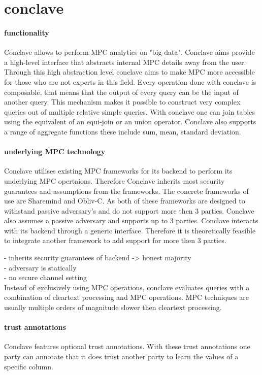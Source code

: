 \section{conclave}


\paragraph {functionality}
Conclave allows to perform MPC analytics on "big data". Conclave aims provide a high-level interface that abstracts internal MPC details away from the user. Through this high abstraction level conclave aims to make MPC more accessible for those who are not experts in this field.  Every operation done with conclave is composable, that means that the output of every query can be the input of another query. This mechanism makes it possible to construct very complex queries out of multiple relative simple queries.  With conclave one can join tables using the equivalent of an equi-join or an union operator. Conclave also supports a range of aggregate functions these include sum, mean, standard deviation. 

\paragraph{underlying MPC technology}
Conclave utilises existing MPC frameworks for its backend to perform its underlying MPC opertaions. Therefore Conclave inherits most security guarantees and assumptions from the frameworks. The concrete frameworks of use are Sharemind and Obliv-C. As both of these frameworks are designed to withstand passive adversary's and do not support more then 3 parties. Conclave also assumes a passive adversary and supports up to 3 parties. Conclave interacts with its backend through a generic interface. Therefore it is theoretically feasible to integrate another framework to add support for more then 3 parties. 

- inherits security guarantees of backend -> honest majority \\
- adversary is statically\\
- no secure channel setting\\
Instead of exclusively using MPC operations, conclave evaluates queries with a combination of cleartext processing and MPC operations. 
MPC techniques are usually multiple orders of magnitude slower then cleartext processing. 


\paragraph{trust annotations}
Conclave features optional trust annotations. With these trust annotations one party can annotate that it does trust another party to learn the values of a specific column. 
